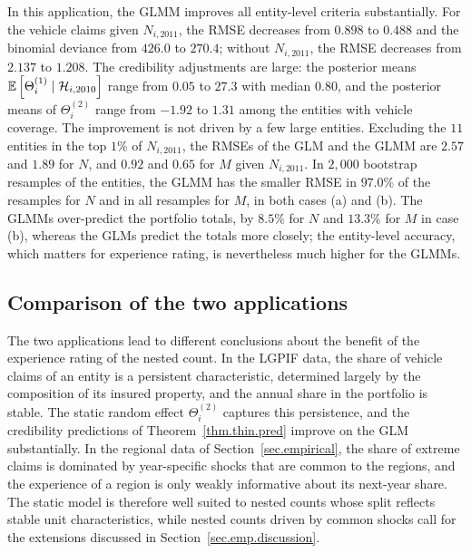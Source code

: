 In this application, the GLMM improves all entity-level criteria
substantially. For the vehicle claims given \(N_{i,2011}\), the RMSE
decreases from \(0.898\) to \(0.488\) and the binomial deviance from
\(426.0\) to \(270.4\); without \(N_{i,2011}\), the RMSE decreases from
\(2.137\) to \(1.208\). The credibility adjustments are large: the
posterior means \({\mathbb E}\left[\Theta_i^{(1)}\mid\mathcal H_{i,2010}\right]\) range from
\(0.05\) to \(27.3\) with median \(0.80\), and the posterior means of
\(\Theta_i^{(2)}\) range from \(-1.92\) to \(1.31\) among the entities with
vehicle coverage. The improvement is not driven by a few large
entities. Excluding the \(11\) entities in the top \(1\%\) of
\(N_{i,2011}\), the RMSEs of the GLM and the GLMM are \(2.57\) and
\(1.89\) for \(N\), and \(0.92\) and \(0.65\) for \(M\) given
\(N_{i,2011}\). In \(2{,}000\) bootstrap resamples of the entities, the
GLMM has the smaller RMSE in \(97.0\%\) of the resamples for \(N\) and in
all resamples for \(M\), in both cases (a) and (b). The GLMMs
over-predict the portfolio totals, by \(8.5\%\) for \(N\) and \(13.3\%\)
for \(M\) in case (b), whereas the GLMs predict the totals more closely;
the entity-level accuracy, which matters for experience rating, is
nevertheless much higher for the GLMMs.

\subsection{Comparison of the two applications}
\label{sec.lgpif.comparison}

The two applications lead to different conclusions about the benefit of
the experience rating of the nested count. In the LGPIF data, the share
of vehicle claims of an entity is a persistent characteristic,
determined largely by the composition of its insured property, and the
annual share in the portfolio is stable. The static random effect
\(\Theta_i^{(2)}\) captures this persistence, and the credibility
predictions of Theorem~\ref{thm.thin.pred} improve on the GLM
substantially. In the regional data of Section~\ref{sec.empirical}, the
share of extreme claims is dominated by year-specific shocks that are
common to the regions, and the experience of a region is only weakly
informative about its next-year share. The static model is therefore
well suited to nested counts whose split reflects stable unit
characteristics, while nested counts driven by common shocks call for
the extensions discussed in Section~\ref{sec.emp.discussion}.
